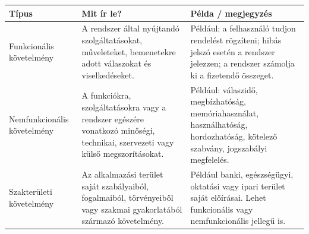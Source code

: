 \begin{tabularx}{\textwidth}{L{32mm}X X}
\toprule
\textbf{Típus} & \textbf{Mit ír le?} & \textbf{Példa / megjegyzés} \\
\midrule
Funkcionális követelmény & A rendszer által nyújtandó szolgáltatásokat, műveleteket, bemenetekre adott válaszokat és viselkedéseket. & Például: a felhasználó tudjon rendelést rögzíteni; hibás jelszó esetén a rendszer jelezzen; a rendszer számolja ki a fizetendő összeget. \\
Nemfunkcionális követelmény & A funkciókra, szolgáltatásokra vagy a rendszer egészére vonatkozó minőségi, technikai, szervezeti vagy külső megszorításokat. & Például: válaszidő, megbízhatóság, memóriahasználat, használhatóság, hordozhatóság, kötelező szabvány, jogszabályi megfelelés. \\
Szakterületi követelmény & Az alkalmazási terület saját szabályaiból, fogalmaiból, törvényeiből vagy szakmai gyakorlatából származó követelmény. & Például banki, egészségügyi, oktatási vagy ipari terület saját előírásai. Lehet funkcionális vagy nemfunkcionális jellegű is. \\
\bottomrule
\end{tabularx}
